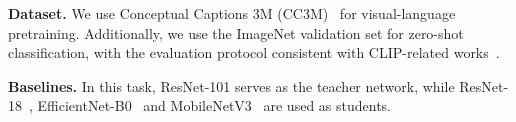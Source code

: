 \documentclass{article} %
\begin{document}
\textbf{Dataset.} We use Conceptual Captions 3M (CC3M)~\citep{sharma2018conceptual} for visual-language pretraining. Additionally, we use the ImageNet validation set for zero-shot classification, with the evaluation protocol consistent with CLIP-related works~\citep{wei2022icar, li2023scaling}.

\textbf{Baselines.} In this task, ResNet-101 serves as the teacher network, while ResNet-18~\citep{he2016deep}, EfficientNet-B0~\citep{tan2019efficientnet} and MobileNetV3~\citep{howard2019searching} are used as students.










\end{document}
